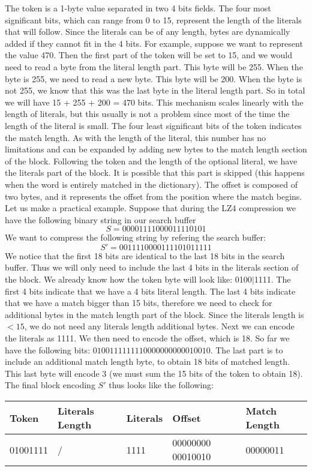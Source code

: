 The token is a 1-byte value separated in two 4 bits fields. The four most significant bits,
which can range from 0 to 15, represent the length of the literals that will follow. Since
the literals can be of any length, bytes are dynamically added if they cannot fit in the 4
bits. For example, suppose we want to represent
the value 470. Then the first part of the token will be set to 15, and we would need to
read a byte from the literal length part. This byte will be 255. When the byte is 255,
we need to read a new byte. This byte will be 200. When the byte is not 255, we know that
this was the last byte in the literal length part. So in total we will have
15 + 255 + 200 = 470 bits.
This mechanism scales linearly with the length of literals, but this usually is not a problem
since most of the time the length of the literal is small.
The four least significant bits of the token indicates the match length. As with the
length of the literal, this number has no limitations and can be expanded by adding new
bytes to the match length section of the block.
Following the token and the length of the optional literal, we have the literals part of
the block. It is possible that this part is skipped (this happens when the word is
entirely matched in the dictionary).
The offset is composed of two bytes, and it represents the offset from the position where
the match begins.
Let us make a practical example. Suppose that during the LZ4 compression we have the following
binary string in our search buffer
$$S = 00001111000011110101$$
We want to compress the following string by refering the search buffer:
$$S' = 0011110000111101011111$$
We notice that the first 18 bits are identical to the last 18 bits in the search buffer. Thus
we will only need to include the last 4 bits in the literals section of the block.
We already know how the token byte will look like: 0100$|$1111. The first 4 bits indicate that
we have a 4 bits literal length. The last 4 bits indicate that we have a match bigger than
15 bits, therefore we need to check for additional bytes in the match length part of the block.
Since the literals length is $< 15$, we do not need any literals length additional bytes.
Next we can encode the literals as 1111. We then need to encode the offset, which is 18.
So far we have the following bits: $01001111 1111 00000000 00010010$.
The last part is to include an additional match length byte, to obtain 18 bits of matched
length. This last byte will encode 3 (we must sum the 15 bits of the token to obtain 18).
The final block encoding $S'$ thus looks like the following:
\begin{table}[!htbp]
\centering
\begin{tabular}{l|l|l|l|l}
\textbf{Token} & \textbf{Literals Length} & \textbf{Literals} & \textbf{Offset} & \textbf{Match Length} \\ 
\hline
01001111 & / & 1111 & 00000000 00010010 & 00000011 \\
\end{tabular}
\end{table}

